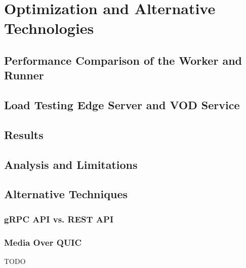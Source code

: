 
\chapter{Optimization and Alternative Technologies}\label{chapter:optimization_and_alternative_technologies}

\section{Performance Comparison of the Worker and Runner}
\section{Load Testing Edge Server and VOD Service}
\section{Results}
\section{Analysis and Limitations}
\section{Alternative Techniques}
\subsection{gRPC API vs. REST API}
\subsection{Media Over QUIC}

TODO